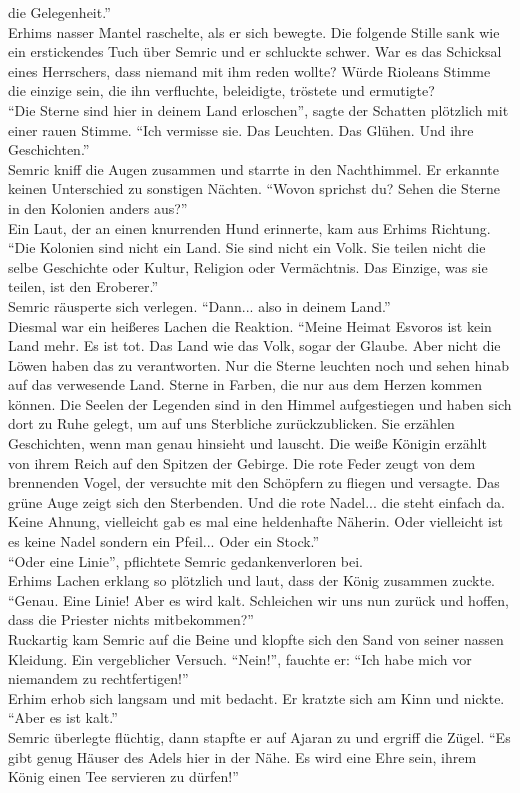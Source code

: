 die Gelegenheit.''\\
Erhims nasser Mantel raschelte, als er sich bewegte. Die folgende Stille sank wie ein erstickendes 
Tuch über Semric und er schluckte schwer. War es das Schicksal eines Herrschers, dass niemand mit 
ihm reden wollte? Würde Rioleans Stimme die einzige sein, die ihn verfluchte, beleidigte, tröstete 
und ermutigte? \\
``Die Sterne sind hier in deinem Land erloschen'', sagte der Schatten plötzlich mit einer rauen 
Stimme. ``Ich vermisse sie. Das Leuchten. Das Glühen. Und ihre Geschichten.''\\
Semric kniff die Augen zusammen und starrte in den Nachthimmel. Er erkannte keinen Unterschied zu 
sonstigen Nächten. ``Wovon sprichst du? Sehen die Sterne in den Kolonien anders aus?''\\
Ein Laut, der an einen knurrenden Hund erinnerte, kam aus Erhims Richtung. ``Die Kolonien sind 
nicht ein Land. Sie sind nicht ein Volk. Sie teilen nicht die selbe Geschichte oder Kultur, 
Religion oder Vermächtnis. Das Einzige, was sie teilen, ist den Eroberer.''\\
Semric räusperte sich verlegen. ``Dann... also in deinem Land.''\\
Diesmal war ein heißeres Lachen die Reaktion. ``Meine Heimat Esvoros ist kein Land mehr. Es ist 
tot. Das Land wie das Volk, sogar der Glaube. Aber nicht die Löwen haben das zu verantworten. Nur 
die Sterne leuchten noch und sehen hinab auf das verwesende Land. Sterne in Farben, die nur aus dem 
Herzen kommen können. Die Seelen der Legenden sind in den Himmel aufgestiegen und haben sich dort 
zu Ruhe gelegt, um auf uns Sterbliche zurückzublicken. Sie erzählen Geschichten, wenn man genau 
hinsieht und lauscht. Die weiße Königin erzählt von ihrem Reich auf den Spitzen der Gebirge. Die 
rote Feder zeugt von dem brennenden Vogel, der versuchte mit den Schöpfern zu fliegen und versagte. 
Das grüne Auge zeigt sich den Sterbenden. Und die rote Nadel... die steht einfach da. Keine Ahnung, 
vielleicht gab es mal eine heldenhafte Näherin. Oder vielleicht ist es keine Nadel sondern ein 
Pfeil... Oder ein Stock.''\\
``Oder eine Linie'', pflichtete Semric gedankenverloren bei.\\
Erhims Lachen erklang so plötzlich und laut, dass der König zusammen zuckte. ``Genau. Eine Linie! 
Aber es wird kalt. Schleichen wir uns nun zurück und hoffen, dass die Priester nichts 
mitbekommen?''\\
Ruckartig kam Semric auf die Beine und klopfte sich den Sand von seiner nassen Kleidung. Ein 
vergeblicher Versuch. ``Nein!'', fauchte er: ``Ich habe mich vor niemandem zu rechtfertigen!''\\
Erhim erhob sich langsam und mit bedacht. Er kratzte sich am Kinn und nickte. ``Aber es ist 
kalt.''\\
Semric überlegte flüchtig, dann stapfte er auf Ajaran zu und ergriff die Zügel. ``Es gibt genug 
Häuser des Adels hier in der Nähe. Es wird eine Ehre sein, ihrem König einen Tee servieren zu 
dürfen!''\\

